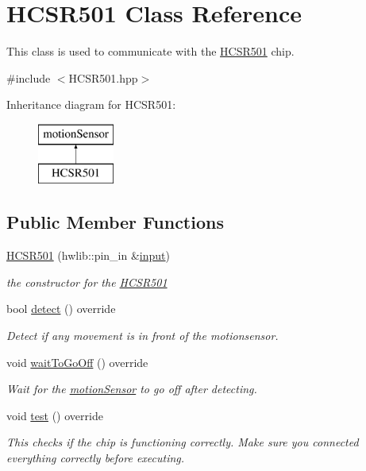 \hypertarget{class_h_c_s_r501}{}\section{H\+C\+S\+R501 Class Reference}
\label{class_h_c_s_r501}


This class is used to communicate with the \mbox{\hyperlink{class_h_c_s_r501}{H\+C\+S\+R501}} chip.  




{\ttfamily \#include $<$H\+C\+S\+R501.\+hpp$>$}

Inheritance diagram for H\+C\+S\+R501\+:\begin{figure}[H]
\begin{center}
\leavevmode
\includegraphics[height=2.000000cm]{class_h_c_s_r501}
\end{center}
\end{figure}
\subsection*{Public Member Functions}
\begin{DoxyCompactItemize}
\item 
\mbox{\hyperlink{class_h_c_s_r501_a589a13daf993e217138344db60086f36}{H\+C\+S\+R501}} (hwlib\+::pin\+\_\+in \&\mbox{\hyperlink{class_h_c_s_r501_a00d41bcf68fa634e07ae68488d2b61ee}{input}})
\begin{DoxyCompactList}\small\item\em the constructor for the \mbox{\hyperlink{class_h_c_s_r501}{H\+C\+S\+R501}} \end{DoxyCompactList}\item 
bool \mbox{\hyperlink{class_h_c_s_r501_a75456a573bf0066ee648f8f1a39d4966}{detect}} () override
\begin{DoxyCompactList}\small\item\em Detect if any movement is in front of the motionsensor. \end{DoxyCompactList}\item 
void \mbox{\hyperlink{class_h_c_s_r501_ad300c0219deddb52c3a5e443be9a96cd}{wait\+To\+Go\+Off}} () override
\begin{DoxyCompactList}\small\item\em Wait for the \mbox{\hyperlink{classmotion_sensor}{motion\+Sensor}} to go off after detecting. \end{DoxyCompactList}\item 
void \mbox{\hyperlink{class_h_c_s_r501_ad90e8669ce7d60213c917c9213366798}{test}} () override
\begin{DoxyCompactList}\small\item\em This checks if the chip is functioning correctly. Make sure you connected everything correctly before executing. \end{DoxyCompactList}\end{DoxyCompactItemize}
